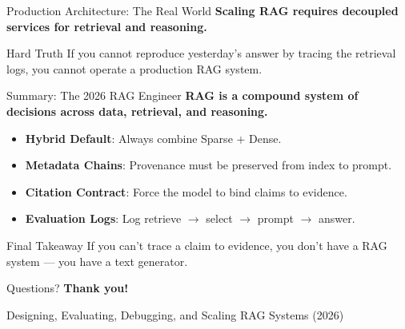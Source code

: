 \documentclass[aspectratio=169, xcolor=table]{beamer}
\newif\ifanimated
\newcommand{\cpause}{\ifanimated\pause\fi}
\begin{document}
\begin{frame}{Production Architecture: The Real World}
\textbf{Scaling RAG requires decoupled services for retrieval and reasoning.}

\vspace{0.1em}
\begin{center}
\resizebox{0.7\textwidth}{!}{

}
\end{center}

\vspace{-0.5em}
\cpause
\begin{block}{Hard Truth}
\scriptsize
If you cannot reproduce yesterday's answer by tracing the retrieval logs, you cannot operate a production RAG system.
\end{block}
\end{frame}

\begin{frame}{Summary: The 2026 RAG Engineer}
\textbf{RAG is a compound system of decisions across data, retrieval, and reasoning.}

\vspace{0.2em}
\begin{itemize}
    \footnotesize
    \item \textbf{Hybrid Default}: Always combine Sparse + Dense.
    \item \textbf{Metadata Chains}: Provenance must be preserved from index to prompt.
    \item \textbf{Citation Contract}: Force the model to bind claims to evidence.
    \item \textbf{Evaluation Logs}: Log retrieve $\rightarrow$ select $\rightarrow$ prompt $\rightarrow$ answer.
\end{itemize}

\vspace{0.2em}
\cpause
\begin{alertblock}{Final Takeaway}
\footnotesize
If you can't trace a claim to evidence, you don't have a RAG system --- you have a text generator.
\end{alertblock}
\end{frame}

\begin{frame}{Questions?}
\centering
\Large \textbf{Thank you!}

\vspace{2em}
\normalsize
Designing, Evaluating, Debugging, and Scaling RAG Systems (2026)
\end{frame}
\end{document}
